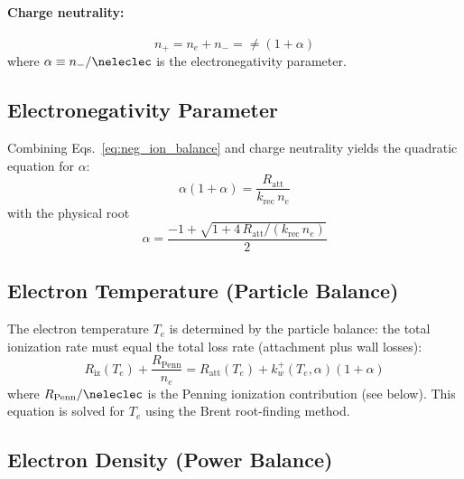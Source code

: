 \documentclass[11pt,a4paper]{article}
\newcommand{\Te}{T_e}
\newcommand{\nelec}{n_e}
\begin{document}
\paragraph{Charge neutrality:}
\begin{equation}
n_+ = \nelec + n_- = \ne(1 + \alpha)
\end{equation}
where $\alpha \equiv n_-/\neleclec$ is the electronegativity parameter.

\subsection{Electronegativity Parameter}

Combining Eqs.~\eqref{eq:neg_ion_balance} and charge neutrality yields the quadratic equation for $\alpha$:
\begin{equation}
\alpha(1+\alpha) = \frac{R_\mathrm{att}}{k_\mathrm{rec}\,\nelec}
\label{eq:alpha_quadratic}
\end{equation}
with the physical root
\begin{equation}
\alpha = \frac{-1 + \sqrt{1 + 4\,R_\mathrm{att}/(k_\mathrm{rec}\,\nelec)}}{2}
\end{equation}

\subsection{Electron Temperature (Particle Balance)}

The electron temperature $\Te$ is determined by the particle balance: the total ionization rate must equal the total loss rate (attachment plus wall losses):
\begin{equation}
R_\mathrm{iz}(\Te) + \frac{R_\mathrm{Penn}}{\nelec} = R_\mathrm{att}(\Te) + k_w^+(\Te,\alpha)(1+\alpha)
\label{eq:Te_balance}
\end{equation}
where $R_\mathrm{Penn}/\neleclec$ is the Penning ionization contribution (see below).  This equation is solved for $\Te$ using the Brent root-finding method.

\subsection{Electron Density (Power Balance)}
\end{document}
